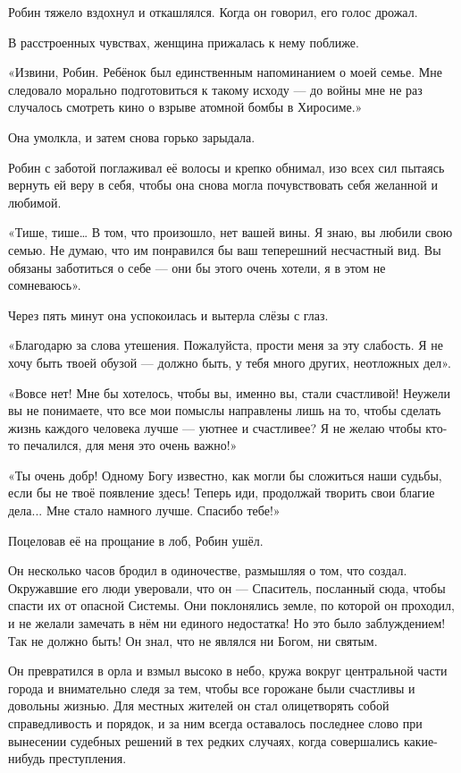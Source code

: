 \documentclass[a4paper,12pt]{book}
\begin{document}
\par
Робин тяжело вздохнул и откашлялся. Когда он говорил, его голос дрожал.
\par
В расстроенных чувствах, женщина прижалась к нему поближе.
\par
«Извини, Робин. Ребёнок был единственным напоминанием о моей семье. Мне следовало морально подготовиться к такому исходу — до войны мне не раз случалось смотреть кино о взрыве атомной бомбы в Хиросиме.»
\par
Она умолкла, и затем снова горько зарыдала.
\par
Робин с заботой поглаживал её волосы и крепко обнимал, изо всех сил пытаясь вернуть ей веру в себя, чтобы она снова могла почувствовать себя желанной и любимой.
\par
«Тише, тише… В том, что произошло, нет вашей вины. Я знаю, вы любили свою семью. Не думаю, что им понравился бы ваш теперешний несчастный вид. Вы обязаны заботиться о себе — они бы этого очень хотели, я в этом не сомневаюсь».
\par
Через пять минут она успокоилась и вытерла слёзы с глаз.
\par
«Благодарю за слова утешения. Пожалуйста, прости меня за эту слабость. Я не хочу быть твоей обузой — должно быть, у тебя много других, неотложных дел».
\par
«Вовсе нет! Мне бы хотелось, чтобы вы, именно вы, стали счастливой! Неужели вы не понимаете, что все мои помыслы направлены лишь на то, чтобы сделать жизнь каждого человека лучше — уютнее и счастливее? Я не желаю чтобы кто-то печалился, для меня это очень важно!»
\par
«Ты очень добр! Одному Богу известно, как могли бы сложиться наши судьбы, если бы не твоё появление здесь! Теперь иди, продолжай творить свои благие дела... Мне стало намного лучше. Спасибо тебе!»
\par
Поцеловав её на прощание в лоб, Робин ушёл.
\par
Он несколько часов бродил в одиночестве, размышляя о том, что создал. Окружавшие его люди уверовали, что он — Спаситель, посланный сюда, чтобы спасти их от опасной Системы. Они поклонялись земле, по которой он проходил, и не желали замечать в нём ни единого недостатка! Но это было заблуждением! Так не должно быть! Он знал, что не являлся ни Богом, ни святым.\\
\par
Он превратился в орла и взмыл высоко в небо, кружа вокруг центральной части города и внимательно следя за тем, чтобы все горожане были счастливы и довольны жизнью. Для местных жителей он стал олицетворять собой справедливость и порядок, и за ним всегда оставалось последнее слово при вынесении судебных решений в тех редких случаях, когда совершались какие-нибудь преступления.\\
\end{document}
